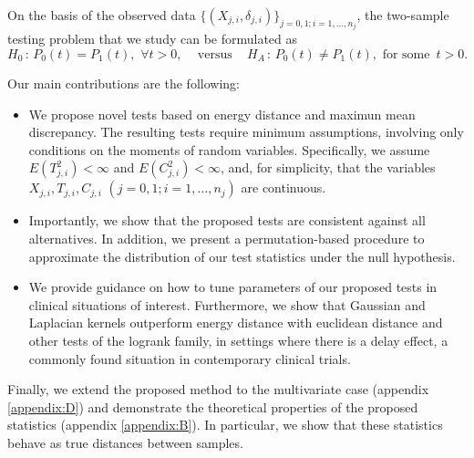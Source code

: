 \documentclass[11pt]{article}
\begin{document}
On the basis  of the  observed  data $\{(X_{j,i},\delta_{j,i})\}_{j=0,1; i=1,\dots,n_j}$,  the two-sample testing  problem that we study can be formulated as
\begin{equation}
\label{eqn:model}
	 H_0\,:\, P_0(t)  =  P_1(t), \,\,\forall  t> 0,\,\,\,\,\,\,\,\text{versus}\,\,\,\,\,\,\,  H_A\,:\, P_0(t)  \neq   P_1(t), \,\,\text{for some}\,\,\, t> 0.
\end{equation}

Our main contributions are the following:

\begin{itemize}
	\item We propose  novel  tests  based  on   energy distance and maximun mean discrepancy. The resulting  tests require minimum assumptions, involving only conditions on the moments of random variables. Specifically,  we  assume $ E(T_{j,i}^{2})<\infty $ and $ E(C_{j,i}^ {2}) <\infty$, and, for simplicity, that the variables $X_{j,i}, T_{j,i},C_{j,i}$ $(j=0,1; i=1,\dots,n_j)$ are continuous. %
	
	
	\item Importantly,  we show   that  the proposed  tests  are  consistent  against all alternatives. In addition, we   present  a permutation-based  procedure to  approximate the distribution of our test statistics under the null hypothesis.%
	
	\item We provide guidance on how to tune parameters of our proposed  tests  in clinical situations of interest. Furthermore, we show that Gaussian and Laplacian kernels  outperform energy distance with euclidean distance  and other tests of the logrank family, in settings where there is  a delay effect, a commonly  found situation in contemporary clinical trials. 
	
	
	
\end{itemize}

Finally, we extend the proposed method to the multivariate case (appendix \ref{appendix:D}) and  demonstrate the theoretical properties of the proposed  statistics  (appendix \ref{appendix:B}). In particular, we show that these statistics behave as  true distances between  samples.
\end{document}
